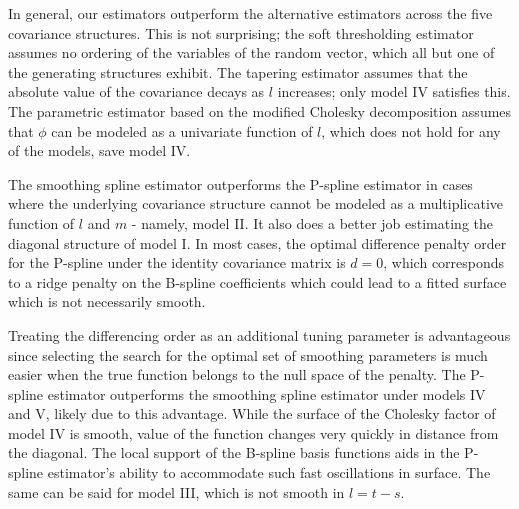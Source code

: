 \bigskip

In general, our estimators outperform the alternative estimators across the five covariance structures. This is not surprising; the soft thresholding estimator assumes no ordering of the variables of the random vector, which all but one of the generating structures exhibit. The tapering estimator assumes that the absolute value of the covariance decays as $l$ increases; only model IV satisfies this. The parametric estimator based on the modified Cholesky decomposition assumes that $\phi$ can be modeled as a univariate function of $l$, which does not hold for any of the models, save model IV.

\bigskip

The smoothing spline estimator outperforms the P-spline estimator in cases where the underlying covariance structure cannot be modeled as a multiplicative function of $l$ and $m$ - namely, model II. It also does a better job estimating the diagonal structure of model I. In most cases, the optimal difference penalty order for the P-spline under the identity covariance matrix is $d = 0$, which corresponds to a ridge penalty on the B-spline coefficients which could lead to a fitted surface which is not necessarily smooth. 

\bigskip

Treating the differencing order as an additional tuning parameter is advantageous since selecting the search for the optimal set of smoothing parameters is much easier when the true function belongs to the null space of the penalty. The P-spline estimator outperforms the smoothing spline estimator under models IV and V, likely due to this advantage. While the surface of the Cholesky factor of model IV is smooth, value of the function changes very quickly in distance from the diagonal. The local support of the B-spline basis functions aids in the P-spline estimator's ability to accommodate such fast oscillations in surface. The same can be said for model III, which is not smooth in $l = t - s$.
 
